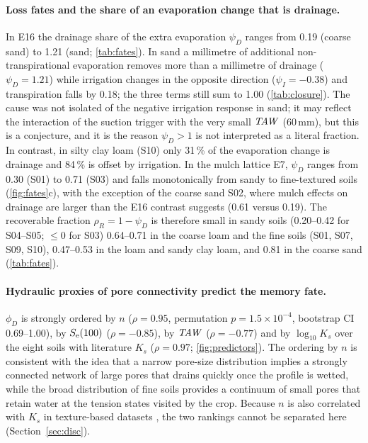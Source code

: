 \paragraph{Loss fates and the share of an evaporation change that is drainage.}
In E16 the drainage share of the extra evaporation $\psi_D$ ranges from 0.19 (coarse sand) to 1.21 (sand; \cref{tab:fates}). In sand a millimetre of additional non-transpirational evaporation removes more than a millimetre of drainage ($\psi_D=1.21$) while irrigation changes in the opposite direction ($\psi_I=-0.38$) and transpiration falls by 0.18; the three terms still sum to 1.00 (\cref{tab:closure}). The cause was not isolated of the negative irrigation response in sand; it may reflect the interaction of the suction trigger with the very small $\mathit{TAW}$ (60\,mm), but this is a conjecture, and it is the reason $\psi_D>1$ is not interpreted as a literal fraction. In contrast, in silty clay loam (S10) only 31\,\% of the evaporation change is drainage and 84\,\% is offset by irrigation. In the mulch lattice E7, $\psi_D$ ranges from 0.30 (S01) to 0.71 (S03) and falls monotonically from sandy to fine-textured soils (\cref{fig:fates}c), with the exception of the coarse sand S02, where mulch effects on drainage are larger than the E16 contrast suggests (0.61 versus 0.19). The recoverable fraction $\rho_R=1-\psi_D$ is therefore small in sandy soils (0.20--0.42 for S04--S05; $\leq0$ for S03) 0.64--0.71 in the coarse loam and the fine soils (S01, S07, S09, S10), 0.47--0.53 in the loam and sandy clay loam, and 0.81 in the coarse sand (\cref{tab:fates}).

\paragraph{Hydraulic proxies of pore connectivity predict the memory fate.}
$\phi_D$ is strongly ordered by $n$ ($\rho=0.95$, permutation $p=1.5\times10^{-4}$, bootstrap CI 0.69--1.00), by $S_{\mathrm{e}}(100)$ ($\rho=-0.85$), by $\mathit{TAW}$ ($\rho=-0.77$) and by $\log_{10}K_s$ over the eight soils with literature $K_s$ ($\rho=0.97$; \cref{fig:predictors}). The ordering by $n$ is consistent with the idea that a narrow pore-size distribution implies a strongly connected network of large pores that drains quickly once the profile is wetted, while the broad distribution of fine soils provides a continuum of small pores that retain water at the tension states visited by the crop. Because $n$ is also correlated with $K_s$ in texture-based datasets \citep{Carsel1988,Schaap2001,Weber2024}, the two rankings cannot be separated here (Section~\ref{sec:disc}).

